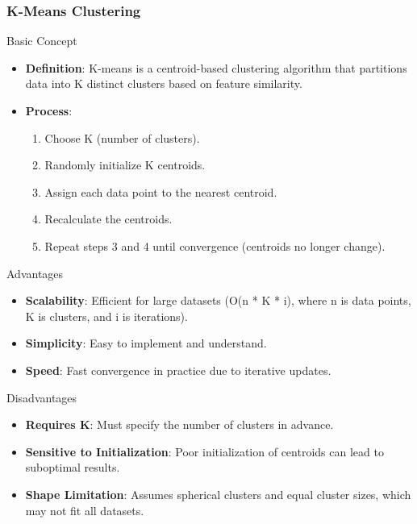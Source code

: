\documentclass[aspectratio=169]{beamer}
\begin{document}
\begin{frame}[fragile]
    \frametitle{K-Means Clustering}
    
    \begin{block}{Basic Concept}
        \begin{itemize}
            \item \textbf{Definition}: K-means is a centroid-based clustering algorithm that partitions data into K distinct clusters based on feature similarity.
            \item \textbf{Process}:
                \begin{enumerate}
                    \item Choose K (number of clusters).
                    \item Randomly initialize K centroids.
                    \item Assign each data point to the nearest centroid.
                    \item Recalculate the centroids.
                    \item Repeat steps 3 and 4 until convergence (centroids no longer change).
                \end{enumerate}
        \end{itemize}
    \end{block}
    
    \begin{block}{Advantages}
        \begin{itemize}
            \item \textbf{Scalability}: Efficient for large datasets (O(n * K * i), where n is data points, K is clusters, and i is iterations).
            \item \textbf{Simplicity}: Easy to implement and understand.
            \item \textbf{Speed}: Fast convergence in practice due to iterative updates.
        \end{itemize}
    \end{block}
    
    \begin{block}{Disadvantages}
        \begin{itemize}
            \item \textbf{Requires K}: Must specify the number of clusters in advance.
            \item \textbf{Sensitive to Initialization}: Poor initialization of centroids can lead to suboptimal results.
            \item \textbf{Shape Limitation}: Assumes spherical clusters and equal cluster sizes, which may not fit all datasets.
        \end{itemize}
    \end{block}
\end{frame}
\end{document}
